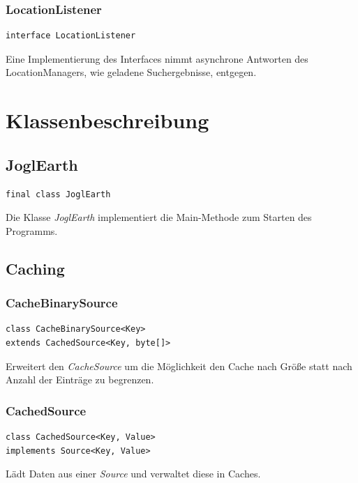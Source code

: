 \documentclass[10pt]{scrreprt}
\begin{document}
\vspace{5mm}
\subsection*{LocationListener}
\begin{lstlisting}
interface LocationListener
\end{lstlisting}
Eine Implementierung des Interfaces nimmt asynchrone Antworten des LocationManagers, wie geladene Suchergebnisse, entgegen.\\




\chapter{Klassenbeschreibung}
\section{JoglEarth}
\begin{lstlisting}
final class JoglEarth
\end{lstlisting}
Die Klasse \textit{JoglEarth} implementiert die Main-Methode zum Starten des Programms.\\

\vspace{5mm}
\section{Caching}
\subsection*{CacheBinarySource}
\begin{lstlisting}
class CacheBinarySource<Key>
extends CachedSource<Key, byte[]>
\end{lstlisting}
Erweitert den \textit{CacheSource} um die Möglichkeit den Cache nach Größe statt nach Anzahl der Einträge zu begrenzen.\\

\vspace{5mm}
\subsection*{CachedSource}
\begin{lstlisting}
class CachedSource<Key, Value>
implements Source<Key, Value>
\end{lstlisting}
Lädt Daten aus einer \textit{Source} und verwaltet diese in Caches.\\
\end{document}
